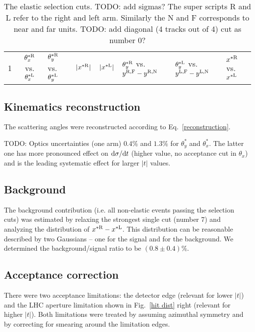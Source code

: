 \documentclass[doublecol]{../macros/epl2}
\def\d{{\rm d}}
\begin{document}
\begin{table}
\caption{The elastic selection cuts. TODO: add sigmas? The super scripts R and L refer to the right and left arm. Similarly the N and F corresponds to near and far units. TODO: add diagonal (4 tracks out of 4) cut as number 0?}
\label{cuts}
\begin{center}
\begin{tabular}{cc} & $\theta_x^{*\rm R}$ vs. $\theta_x^{*\rm L}$			 & $\theta_y^{*\rm R}$ vs. $\theta_y^{*\rm L}$			 & $|x^{*\rm R}|$ 									 & $|x^{*\rm L}|$ 									 & $\theta_y^{*\rm R}$ vs. $y^{\rm R,F} - y^{\rm R,N}$	 & $\theta_y^{*\rm L}$ vs. $y^{\rm L,F} - y^{\rm L,N}$	 & $x^{*\rm R}$ vs. $x^{*\rm L}$					\cr\hline
\end{tabular}
\end{center}
\end{table}


\subsection{Kinematics reconstruction}

The scattering angles were reconstructed according to Eq.~\ref{reconstruction}.

TODO: Optics uncertainties (one arm) $0.4\%$ and $1.3\%$ for $\theta^*_y$ and $\theta^*_x$. The latter one has more pronounced effect on $\d\sigma/\d t$ (higher value, no acceptance cut in $\theta_x$) and is the leading systematic effect for larger $|t|$ values.


\subsection{Background}

The background contribution (i.e. all non-elastic events passing the selection cuts) was estimated by relaxing the strongest single cut (number 7) and analyzing the distribution of $x^{*\rm R} - x^{*\rm L}$. This distribution can be reasonable described by two Gaussians -- one for the signal and for the background. We determined the background/signal ratio to be $(0.8 \pm 0.4)\%$.

\subsection{Acceptance correction}

There were two acceptance limitations: the detector edge (relevant for lower $|t|$) and the LHC aperture limitation shown in Fig.~\ref{hit dist} right (relevant for higher $|t|$). Both limitations were treated by assuming azimuthal symmetry and by correcting for smearing around the limitation edges.
\end{document}
